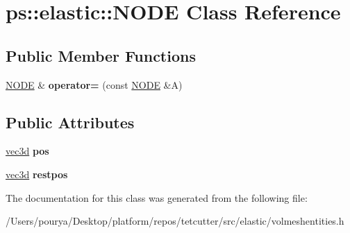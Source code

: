 \hypertarget{classps_1_1elastic_1_1NODE}{}\section{ps\+:\+:elastic\+:\+:N\+O\+D\+E Class Reference}
\label{classps_1_1elastic_1_1NODE}
\subsection*{Public Member Functions}
\begin{DoxyCompactItemize}
\item 
\hypertarget{classps_1_1elastic_1_1NODE_aa69fa9845a0c9308000a51a1b90a04f1}{}\hyperlink{classps_1_1elastic_1_1NODE}{N\+O\+D\+E} \& {\bfseries operator=} (const \hyperlink{classps_1_1elastic_1_1NODE}{N\+O\+D\+E} \&A)\label{classps_1_1elastic_1_1NODE_aa69fa9845a0c9308000a51a1b90a04f1}

\end{DoxyCompactItemize}
\subsection*{Public Attributes}
\begin{DoxyCompactItemize}
\item 
\hypertarget{classps_1_1elastic_1_1NODE_a6a3c621ea0ec87a55611c95f8cb1b7ca}{}\hyperlink{classps_1_1base_1_1Vec3}{vec3d} {\bfseries pos}\label{classps_1_1elastic_1_1NODE_a6a3c621ea0ec87a55611c95f8cb1b7ca}

\item 
\hypertarget{classps_1_1elastic_1_1NODE_ad6f2065a2d151d32bee55b1da3a26519}{}\hyperlink{classps_1_1base_1_1Vec3}{vec3d} {\bfseries restpos}\label{classps_1_1elastic_1_1NODE_ad6f2065a2d151d32bee55b1da3a26519}

\end{DoxyCompactItemize}


The documentation for this class was generated from the following file\+:\begin{DoxyCompactItemize}
\item 
/\+Users/pourya/\+Desktop/platform/repos/tetcutter/src/elastic/volmeshentities.\+h\end{DoxyCompactItemize}
